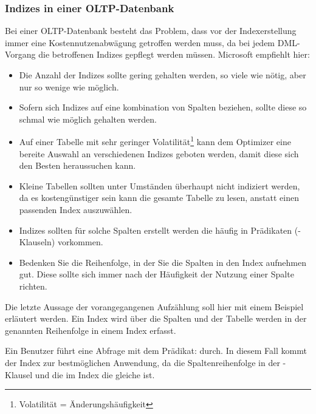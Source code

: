         \subsubsection{Indizes in einer OLTP-Datenbank}
          Bei einer OLTP-Datenbank besteht das Problem, dass vor der
          Indexerstellung immer eine Kostennutzenabwägung getroffen werden muss,
          da bei jedem DML-Vorgang die betroffenen Indizes gepflegt werden
          müssen. Microsoft empfiehlt hier:
          \begin{itemize}
            \item Die Anzahl der Indizes sollte gering gehalten werden, so viele
            wie nötig, aber nur so wenige wie möglich.
            \item Sofern sich Indizes auf eine kombination von Spalten beziehen,
            sollte diese so schmal wie möglich gehalten werden.
            \item Auf einer Tabelle mit sehr geringer
            Volatilität\footnote{Volatilität = Änderungshäufigkeit} kann dem
            Optimizer eine bereite Auswahl an verschiedenen Indizes geboten
            werden, damit diese sich den Besten heraussuchen kann.
            \item Kleine Tabellen sollten unter Umständen überhaupt nicht
            indiziert werden, da es kostengünstiger sein kann die gesamte
            Tabelle zu lesen, anstatt einen passenden Index auszuwählen.
            \item Indizes sollten für solche Spalten erstellt werden die häufig
            in Prädikaten (\WHERE-Klauseln) vorkommen.
            \item Bedenken Sie die Reihenfolge, in der Sie die Spalten in den
            Index aufnehmen gut. Diese sollte sich immer nach der Häufigkeit der
            Nutzung einer Spalte richten.
          \end{itemize}
          Die letzte Aussage der vorangegangenen Aufzählung soll hier mit einem
          Beispiel erläutert werden. Ein Index wird über die Spalten
           und  der Tabelle
           werden in der genannten Reihenfolge in einem
          Index erfasst.
          
          Ein Benutzer führt eine Abfrage mit dem Prädikat:
           durch. In
          diesem Fall kommt der Index zur bestmöglichen Anwendung, da die
          Spaltenreihenfolge in der \WHERE-Klausel und die im Index die gleiche
          ist.
          
